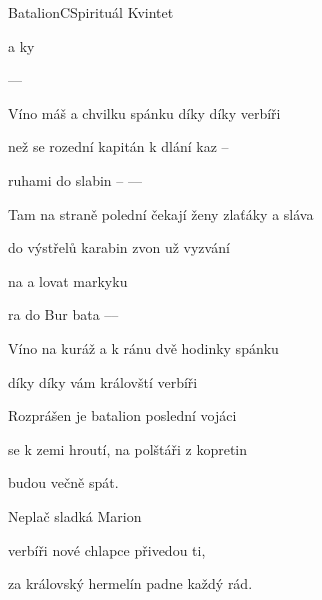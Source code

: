 \begin{song}{Batalion}{C}{Spirituál Kvintet}

\begin{SBChorus}
  a ky

  ---- 

Víno máš a chvilku spánku díky díky verbíři
\end{SBChorus}
\begin{SBVerse}
 než se rozední kapitán k dlání kaz --

ruhami do slabin -- ----

Tam na straně polední čekají ženy zlaťáky a sláva

do výstřelů karabin zvon už vyzvání
\end{SBVerse}
\begin{SBChorus}
 na  a lovat markyku

ra do Bur bata ----

Víno na kuráž a k ránu dvě hodinky spánku

díky díky vám královští verbíři

\end{SBChorus}
\begin{SBVerse}
Rozprášen je batalion poslední vojáci

se k zemi hroutí, na polštáři z kopretin

budou večně spát.

Neplač sladká Marion

verbíři nové chlapce přivedou ti,

za královský hermelín padne každý rád.
\end{SBVerse}
\end{song}
\pagebreak
